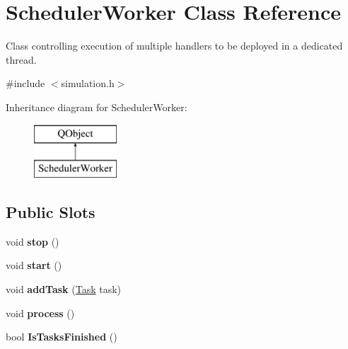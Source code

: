 \hypertarget{class_scheduler_worker}{}\section{Scheduler\+Worker Class Reference}
\label{class_scheduler_worker}


Class controlling execution of multiple handlers to be deployed in a dedicated thread.  




{\ttfamily \#include $<$simulation.\+h$>$}

Inheritance diagram for Scheduler\+Worker\+:\begin{figure}[H]
\begin{center}
\leavevmode
\includegraphics[height=2.000000cm]{class_scheduler_worker}
\end{center}
\end{figure}
\subsection*{Public Slots}
\begin{DoxyCompactItemize}
\item 
\mbox{\label{class_scheduler_worker_ac5b2e3ffa0470416221e3ec07956a628}} 
void {\bfseries stop} ()
\item 
\mbox{\label{class_scheduler_worker_ae17d3b4fd5068714a32b8be97a7ecac1}} 
void {\bfseries start} ()
\item 
\mbox{\label{class_scheduler_worker_a15b321a2369b6ccfe7af4351ed4d1960}} 
void {\bfseries add\+Task} (\hyperlink{struct_task}{Task} task)
\item 
\mbox{\label{class_scheduler_worker_a35a536a33b478e22f28dd508d6eb3242}} 
void {\bfseries process} ()
\item 
\mbox{\label{class_scheduler_worker_a93bcfd25dea100ac89372fc14710c86e}} 
bool {\bfseries Is\+Tasks\+Finished} ()
\end{DoxyCompactItemize}
